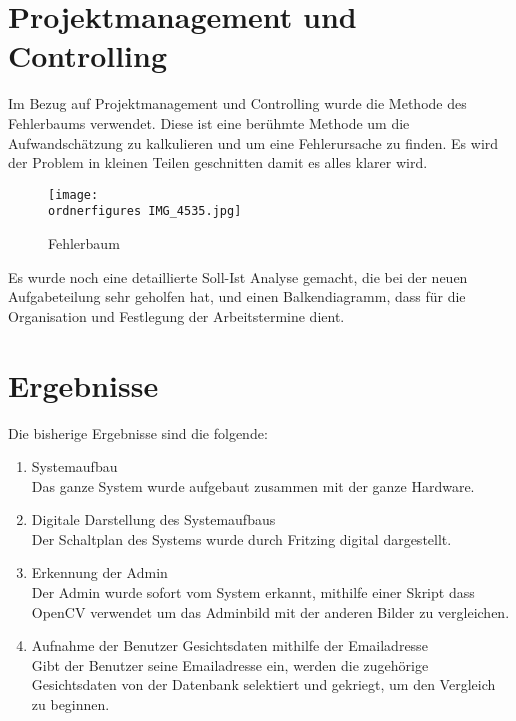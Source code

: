 \section{Projektmanagement und Controlling}
		Im Bezug auf Projektmanagement und Controlling wurde die Methode des Fehlerbaums verwendet. Diese ist eine ber{\"u}hmte Methode um die Aufwandsch{\"a}tzung zu kalkulieren und um eine Fehlerursache zu finden. Es wird der Problem in kleinen Teilen geschnitten damit es alles klarer wird. 
		\begin{figure}		\texttt{[image: \\ordnerfigures IMG\_4535.jpg]}
		\caption{Fehlerbaum}
		\end{figure}
	Es wurde noch eine detaillierte Soll-Ist Analyse gemacht, die bei der neuen Aufgabeteilung sehr geholfen hat, und einen Balkendiagramm, dass f{\"u}r die Organisation und Festlegung der Arbeitstermine dient.
\section{Ergebnisse}
	Die bisherige Ergebnisse sind die folgende:\\
	\begin{enumerate}
		\item Systemaufbau \\
		Das ganze System wurde aufgebaut zusammen mit der ganze Hardware.
		\item Digitale Darstellung des Systemaufbaus\\
		Der Schaltplan des Systems wurde durch Fritzing digital dargestellt.
		\item Erkennung der Admin \\
		Der Admin wurde sofort vom System erkannt, mithilfe einer Skript dass OpenCV verwendet um das Adminbild mit der anderen Bilder zu vergleichen.
		\item Aufnahme der Benutzer Gesichtsdaten mithilfe der Emailadresse\\
		Gibt der Benutzer seine Emailadresse ein, werden die zugehörige Gesichtsdaten von der Datenbank selektiert und gekriegt, um den Vergleich zu beginnen.
	\end{enumerate}


